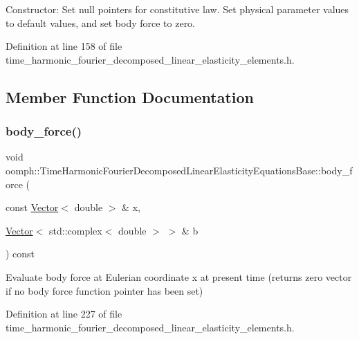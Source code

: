 Constructor\+: Set null pointers for constitutive law. Set physical parameter values to default values, and set body force to zero. 



Definition at line 158 of file time\+\_\+harmonic\+\_\+fourier\+\_\+decomposed\+\_\+linear\+\_\+elasticity\+\_\+elements.\+h.



\subsection{Member Function Documentation}
\mbox{\label{classoomph_1_1TimeHarmonicFourierDecomposedLinearElasticityEquationsBase_a7e28782573e1210b9a5f98f17360f6e9}} 
\subsubsection{\texorpdfstring{body\+\_\+force()}{body\_force()}}
{\footnotesize\ttfamily void oomph\+::\+Time\+Harmonic\+Fourier\+Decomposed\+Linear\+Elasticity\+Equations\+Base\+::body\+\_\+force (\begin{DoxyParamCaption}\item[{const \hyperlink{classoomph_1_1Vector}{Vector}$<$ double $>$ \&}]{x,  }\item[{\hyperlink{classoomph_1_1Vector}{Vector}$<$ std\+::complex$<$ double $>$ $>$ \&}]{b }\end{DoxyParamCaption}) const\hspace{0.3cm}{\ttfamily [inline]}}



Evaluate body force at Eulerian coordinate x at present time (returns zero vector if no body force function pointer has been set) 



Definition at line 227 of file time\+\_\+harmonic\+\_\+fourier\+\_\+decomposed\+\_\+linear\+\_\+elasticity\+\_\+elements.\+h.



